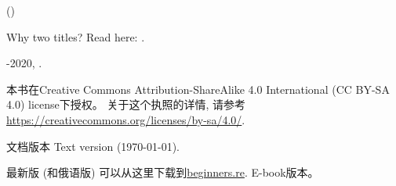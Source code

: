 \documentclass[UTF8,nofonts]{ctexart}
\begin{document}

\begin{titlepage}


\end{titlepage}

\newpage

\begin{center}
\vspace*{\fill}
{\LARGE \TitleMain}

\bigskip

{\large (\TitleAux)}

\bigskip
\bigskip
Why two titles? Read here: . %

\vspace*{\fill}

{\large \AUTHOR}

{\large \TT{<\EMAIL>}}
\vspace*{\fill}
\vfill

\ccbysa

-2020, \AUTHOR. 

本书在Creative Commons Attribution-ShareAlike 4.0 International (CC BY-SA 4.0) license下授权。
关于这个执照的详情, 请参考\url{https://creativecommons.org/licenses/by-sa/4.0/}.

文档版本 Text version ({\large \today}).

最新版 (和俄语版) 可以从这里下载到\href{http://go.yurichev.com/17009}{beginners.re}.
E-book版本。

\end{center}
\end{document}
